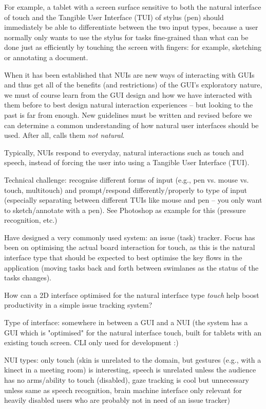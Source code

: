 For example, a tablet with a screen surface sensitive to both the natural interface of touch and the Tangible User Interface (TUI) of stylus (pen) should immediately be able to differentiate between the two input types, because a user normally only wants to use the stylus for tasks fine-grained than what can be done just as efficiently by touching the screen with fingers: for example, sketching or annotating a document.

When it has been established that NUIs are new ways of interacting with GUIs and thus get all of the benefits (and restrictions) of the GUI's exploratory nature, we must of course learn from the GUI design and how we have interacted with them before to best design natural interaction experiences -- but looking to the past is far from enough. New guidelines must be written and revised before we can determine a common understanding of how natural user interfaces should be used. After all, \textcite{norman:natural-user-interfaces-are-not-natural:2010} calls them \textit{not natural}.

Typically, NUIs respond to everyday, natural interactions such as touch and speech, instead of forcing the user into using a Tangible User Interface (TUI).

Technical challenge: recognise different forms of input (e.g., pen vs. mouse vs. touch, multitouch) and prompt/respond differently/properly to type of input (especially separating between different TUIs like mouse and pen -- you only want to sketch/annotate with a pen). See Photoshop as example for this (pressure recognition, etc.)

Have designed a very commonly used system: an issue (task) tracker. Focus has been on optimising the actual board interaction for touch, as this is the natural interface type that should be expected to best optimise the key flows in the application (moving tasks back and forth between swimlanes as the status of the tasks changes).

How can a 2D interface optimised for the natural interface type \textit{touch} help boost productivity in a simple issue tracking system?

Type of interface: somewhere in between a GUI and a NUI (the system has a GUI which is "optimised" for the natural interface touch, built for tablets with an existing touch screen. CLI only used for development :)

NUI types: only touch (skin is unrelated to the domain, but gestures (e.g., with a kinect in a meeting room) is interesting, speech is unrelated unless the audience has no arms/ability to touch (disabled), gaze tracking is cool but unnecessary unless same as speech recognition, brain machine interface only relevant for heavily disabled users who are probably not in need of an issue tracker)
